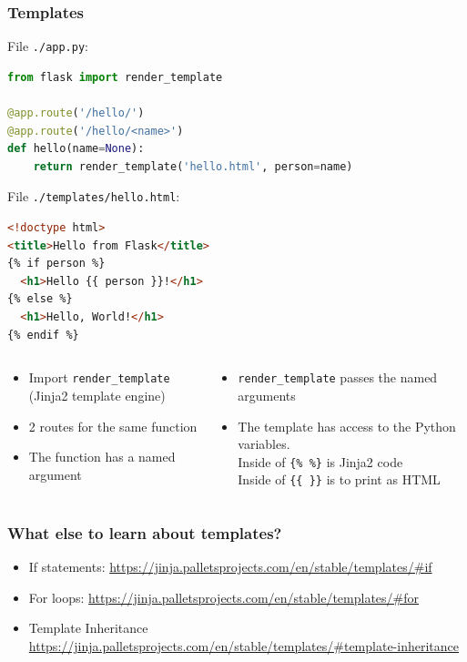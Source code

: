 \documentclass[fleqn,aspectratio=169,10pt]{beamer}
\begin{document}
\begin{frame}[fragile]
  \frametitle{Templates}
  \vspace*{-1.5ex}
  File \texttt{./app.py}:
\begin{lstlisting}[language=Python]
from flask import render_template

@app.route('/hello/')
@app.route('/hello/<name>')
def hello(name=None):
    return render_template('hello.html', person=name)
\end{lstlisting}

  File \texttt{./templates/hello.html}:
\begin{lstlisting}[language=HTML]
<!doctype html>
<title>Hello from Flask</title>
{% if person %}
  <h1>Hello {{ person }}!</h1>
{% else %}
  <h1>Hello, World!</h1>
{% endif %}
\end{lstlisting}
  \vspace*{-1.5ex}
  \pause
  \begin{columns}
    \begin{column}{.4\textwidth}
      \begin{itemize}
        \item Import \texttt{render\_template}\\ (Jinja2 template engine)
        \item 2 routes for the same function
        \item The function has a named argument
      \end{itemize}
    \end{column}
    \pause
    \begin{column}{.6\textwidth}
      \begin{itemize}
        \item \texttt{render\_template} passes the named arguments
        \item The template has access to the Python variables. \\
              Inside of \texttt{\{\% \%\}} is Jinja2 code \\
              Inside of \texttt{\{\{ \}\}} is to print as HTML
      \end{itemize}
    \end{column}
  \end{columns}
\end{frame}

\begin{frame}[fragile]
  \frametitle{What else to learn about templates?}
  \begin{itemize}
    \item If statements: \url{https://jinja.palletsprojects.com/en/stable/templates/#if}
    \item For loops: \url{https://jinja.palletsprojects.com/en/stable/templates/#for}
    \item Template Inheritance \url{https://jinja.palletsprojects.com/en/stable/templates/#template-inheritance}
  \end{itemize}
\end{frame}
\end{document}
